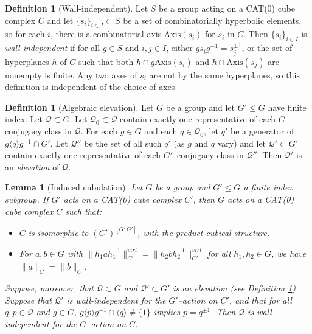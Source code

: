 \documentclass[11pt,oneside]{amsart}
\newcounter{ax}
\newtheorem{lem}[thm]{Lemma}
\theoremstyle{definition}
\newtheorem{defn}[thm]{Definition}
\newcommand{\axis}{\mathrm{Axis}}
\begin{document}
  

\begin{defn}[Wall-independent]\label{defn:wall-independent}
Let $S$ be a group acting on a CAT(0) cube complex $C$ and let $\{s_i\}_{i\in I}\subset S$ be a set of combinatorially hyperbolic elements, so for each $i$, there is a combinatorial axis $\axis(s_i)$ for $s_i$ in $C$.  Then $\{s_i\}_{i\in I}$ is \emph{wall-independent} if for all $g\in S$ and $i,j\in I$, either $gs_ig^{-1}=s_j^{\pm1}$, or the set of hyperplanes $h$ of $C$ such that both $h\cap g\axis(s_i)$ and $h\cap \axis(s_j)$ are nonempty is finite. Any two axes of $s_i$ are cut by the same hyperplanes, so this definition is independent of the choice of axes.
\end{defn}



\begin{defn}[Algebraic elevation]\label{defn:finite-set-elevation}
Let $G$ be a group and let $G'\leq G$ have finite index.  Let $\mathcal Q\subset G$.  Let $\mathcal Q_0\subset \mathcal Q$ contain exactly one representative of each $G$--conjugacy class in $\mathcal Q$.  For each $g\in G$ and each $q\in\mathcal Q_0$, let $q'$ be a generator of $g\langle q\rangle g^{-1}\cap G'$.  Let $\mathcal Q''$ be the set of all such $q'$ (as $g$ and $q$ vary) and let $\mathcal Q'\subset G'$ contain exactly one representative of each $G'$--conjugacy class in $\mathcal Q''$.  Then $\mathcal Q'$ is an \emph{elevation} of $\mathcal Q$.
\end{defn}

\begin{lem}[Induced cubulation]\label{lem:star}
Let $G$ be a group and $G'\leq G$ a finite index subgroup.  If $G'$ acts on a CAT(0) cube complex $C'$, then $G$ acts on a CAT(0) cube complex $C$ such that:
\begin{itemize}
 \item $C$ is isomorphic to $(C')^{[G:G']}$, with the product cubical structure.
 
 \item For $a,b\in G$ with $\|h_1ah_1^{-1}\|_{C'}^{virt}=\|h_2bh_2^{-1}\|_{C'}^{virt}$ for all $h_1,h_2\in G$, we have $\|a\|_C=\|b\|_C$.
\end{itemize}

Suppose, moreover, that $\mathcal Q\subset G$ and $\mathcal Q'\subset G'$ is an elevation (see Definition \ref{defn:finite-set-elevation}).  Suppose that $\mathcal Q'$ is wall-independent for the $G'$--action on $C'$, and that for all $q,p\in\mathcal Q$ and $g\in G$, $g\langle p\rangle g^{-1}\cap \langle q\rangle\neq\{1\}$ implies $p=q^{\pm1}$. Then $\mathcal Q$ is wall-independent for the $G$--action on $C$.
\end{lem}
\end{document}
